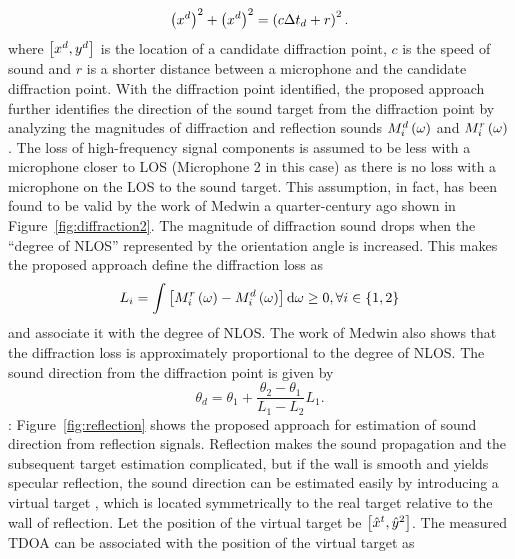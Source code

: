 \documentclass[letterpaper, 10 pt, conference]{ieeeconf}  %
\begin{document}
\begin{equation}\label{eq:TDOA1}
\left ( x^d \right )^2 + \left ( x^d \right )^2 = \left ( c \Delta t_d + r \right )^2.  
\end{equation}
where $\left [ x^d, y^d \right ]$ is the location of a candidate diffraction point, $c$ is the speed of sound and $r$ is a shorter distance between a microphone and the candidate diffraction point.  
With the diffraction point identified, the proposed approach further identifies the direction of the sound target from the diffraction point by analyzing the magnitudes of diffraction and reflection sounds $M_i^d\left ( \omega \right )$ and $M_i^r\left ( \omega \right )$.  The loss of high-frequency signal components is assumed to be less with a microphone closer to LOS (Microphone 2 in this case) as there is no loss with a microphone on the LOS to the sound target.  This assumption, in fact, has been found to be valid by the work of Medwin a quarter-century ago \cite{medwin1981shadowing} shown in Figure~\ref{fig:diffraction2}.  The magnitude of diffraction sound drops when the ``degree of NLOS'' represented by the orientation angle is increased.   This makes the proposed approach define the diffraction loss as
\begin{equation}\label{eq:loss}
L_i = \int \left [ M_i^r\left ( \omega \right ) - M_i^d\left ( \omega \right ) \right ] {\rm d} \omega \geq 0, \forall i \in \left \{ 1,2 \right \}  
\end{equation}
and associate it with the degree of NLOS.  The work of Medwin also shows that the diffraction loss is approximately proportional to the degree of NLOS.  The sound direction from the diffraction point is given by
\begin{equation}\label{eq:direction_diffraction}
\theta_d = \theta_1 + \frac{\theta_2 - \theta_1}{L_1 - L_2} L_1.   
\end{equation}
: Figure~\ref{fig:reflection} shows the proposed approach for estimation of sound direction from reflection signals.  Reflection makes the sound propagation and the subsequent target estimation complicated, but if the wall is smooth and yields specular reflection, the sound direction can be estimated easily by introducing a virtual target \cite{pulkki1997}, which is located symmetrically to the real target relative to the wall of reflection.  Let the position of the virtual target be $\left [ \hat x^t, \hat y^2 \right ]$.  The measured TDOA can be associated with the position of the virtual target as\\
\end{document}
